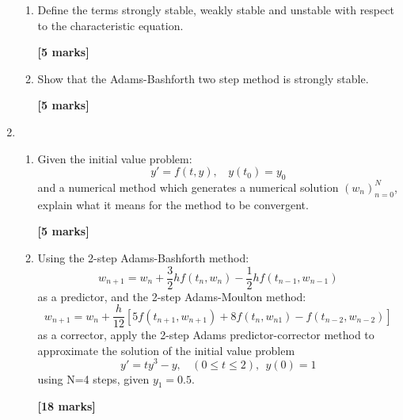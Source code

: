 \begin{enumerate}
\begin{enumerate}
\item
Define the terms strongly stable, weakly stable and unstable with respect to the
characteristic equation.
\begin{flushright}
\textbf{[5 marks]}
\end{flushright}
\item
Show that the Adams-Bashforth two step method is  strongly stable.
\begin{flushright}
\textbf{[5 marks]}
\end{flushright}
\end{enumerate}

\item
\begin{enumerate}
\item
Given the initial value problem: 
\[ y'=f(t,y), \ \ \ \  y(t_0)=y_0 \]
and a numerical method which generates a numerical solution $(w_n)_{n=0}^{N}$, explain what it means for the method to be convergent.
\begin{flushright}
\textbf{[5 marks]}
\end{flushright}
\item
Using the 2-step Adams-Bashforth method:
\[ w_{n+1}=w_n+\frac{3}{2}hf(t_n,w_n)-\frac{1}{2}hf(t_{n-1},w_{n-1})\] 
as a predictor, and the 2-step Adams-Moulton method: 
\[w_{n+1}=w_n + \frac{h}{12}[5f(t_{n+1},w_{n+1})+8f(t_{n},w_{n1})-f(t_{n-2},w_{n-2})] \]
as a corrector, apply the 2-step Adams predictor-corrector method to approximate the solution of the initial value problem
\[y'=ty^3-y, \ \ \ \  (0\leq t \leq 2), \ \ y(0)=1 \]
using N=4 steps, given $y_1=0.5$.
\begin{flushright}
\textbf{[18 marks]}
\end{flushright}


\end{enumerate}
\end{enumerate}
